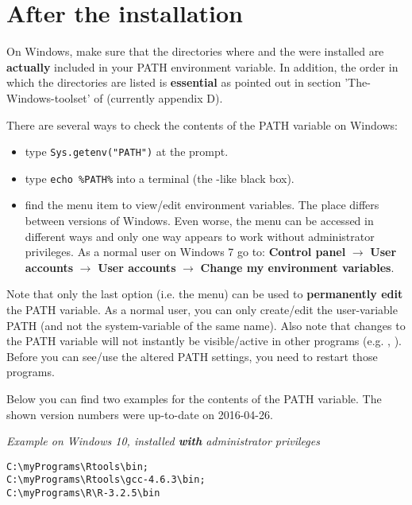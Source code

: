 \documentclass[10pt,a4paper]{article}
\begin{document}
\section{After the installation} \label{sec:postInstall}

On Windows, make sure that the directories where  and the   were installed are \textbf{actually} included in your PATH environment variable. In addition, the order in which the directories are listed is \textbf{essential} as pointed out in section 'The-Windows-toolset' of \radmin{} (currently appendix D).

There are several ways to check the contents of the PATH variable on Windows:

\begin{itemize}
  \item type \verb|Sys.getenv("PATH")| at the  prompt.
  \item type \verb|echo %PATH%| into a  terminal (the -like black box).
  \item find the menu item to view/edit environment variables. The place differs between versions of Windows. Even worse, the menu can be accessed in different ways and only one way appears to work without administrator privileges. As a normal user on Windows 7 go to: \textbf{Control panel} $\rightarrow$ \textbf{User accounts} $\rightarrow$ \textbf{User accounts} $\rightarrow$ \textbf{Change my environment variables}.
\end{itemize}

\noindent Note that only the last option (i.e. the menu) can be used to \textbf{permanently edit} the PATH variable. As a normal user, you can only create/edit the user-variable PATH (and not the system-variable of the same name). Also note that changes to the PATH variable will not instantly be visible/active in other programs (e.g. , ). Before you can see/use the altered PATH settings, you need to restart those programs.

Below you can find two examples for the contents of the PATH variable. The shown version numbers were up-to-date on 2016-04-26.

\bigskip
\textsl{Example on Windows 10, installed \textbf{with} administrator privileges}

\begin{verbatim}
C:\myPrograms\Rtools\bin;
C:\myPrograms\Rtools\gcc-4.6.3\bin;
C:\myPrograms\R\R-3.2.5\bin
\end{verbatim}
\end{document}
